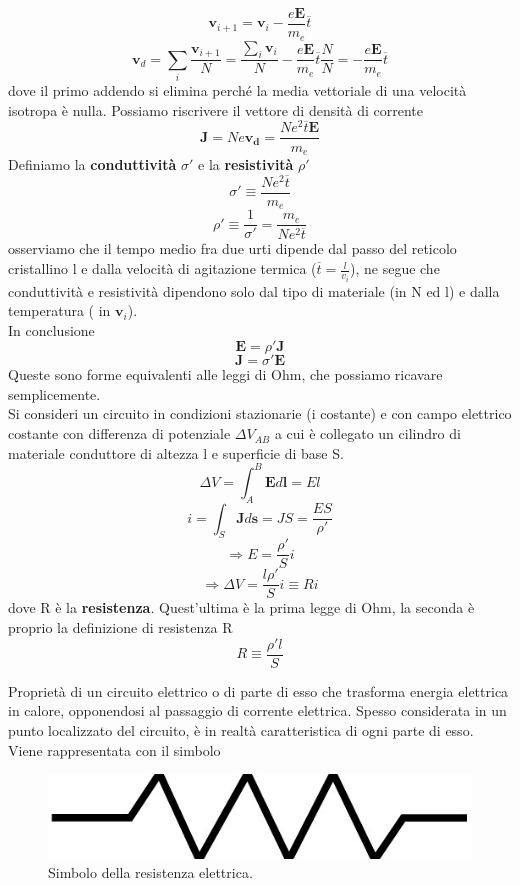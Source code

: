 \documentclass[
10pt, %
a4paper, %
oneside, %
headinclude,footinclude, %
BCOR5mm, %
]{scrartcl}
\begin{document}
\[\mathbf{v}_{i+1}  = \mathbf{v}_i - \frac{e\mathbf{E}}{m_e}\overline{t}\]
\[\mathbf{v}_d = \sum_i\frac{\mathbf{v}_{i+1}}{N}= \frac{\sum_i\mathbf{v}_i}{N} - \frac{e\mathbf{E}}{m_e}\overline{t} \frac{N}{N} = - \frac{e\mathbf{E}}{m_e}\overline{t}\]
dove il primo addendo si elimina perché la media vettoriale di una velocità isotropa è nulla. Possiamo riscrivere il vettore di densità di corrente
\[\mathbf{J}= Ne\mathbf{v_d}= \frac{Ne^2\overline{t}\mathbf{E}}{m_e}\]
Definiamo la \textbf{conduttività} $\sigma'$ e la \textbf{resistività} $\rho'$
\[\sigma' \equiv \frac{Ne^2\overline{t}}{m_e}\]
\[\rho' \equiv \frac{1}{\sigma'}= \frac{m_e}{Ne^2\overline{t}}\]
osserviamo che il tempo medio fra due urti dipende dal passo del reticolo cristallino l e dalla velocità di agitazione termica (\(\overline{t}= \frac{l}{v_i}\)), ne segue che conduttività e resistività dipendono solo dal tipo di materiale (in N ed l) e dalla temperatura ( in $\mathbf{v}_i$). \\
In conclusione
\[\mathbf{E}= \rho' \mathbf{J}\]
\[\mathbf{J}= \sigma' \mathbf{E}\]
Queste sono forme equivalenti alle leggi di Ohm, che possiamo ricavare semplicemente.\\
Si consideri un circuito in condizioni stazionarie (i costante) e con campo elettrico costante con differenza di potenziale \(\Delta V_{AB}\) a cui è collegato un cilindro di materiale conduttore di altezza l e superficie di base S. 
\[\Delta V = \int_{A}^{B}\mathbf{E}d\mathbf{l}=El\]
\[i = \int_S \mathbf{J}d\mathbf{s}= JS= \frac{E S}{\rho'}\]
\[\Rightarrow E = \frac{\rho'}{S}i\]
\[\Rightarrow \Delta V = \frac{l\rho'}{S}i \equiv R i\]
dove R è la \textbf{resistenza}. Quest'ultima è la prima legge di Ohm, la seconda è proprio la definizione di resistenza R
\[R \equiv \frac{\rho' l}{S}\]
\begin{definizione}[Resistenza]
Proprietà di un circuito elettrico o di parte di esso che trasforma energia elettrica in calore, opponendosi al passaggio di corrente elettrica. Spesso considerata in un punto localizzato del circuito, è in realtà caratteristica di ogni parte di esso. Viene rappresentata con il simbolo
\begin{figure}[h!]
	\centering
	\includegraphics[width=0.3\linewidth]{../images/resistenza}
	\caption{Simbolo della resistenza elettrica.}
	\label{fig:resistenza}
\end{figure}
\FloatBarrier
\end{definizione}
\end{document}

